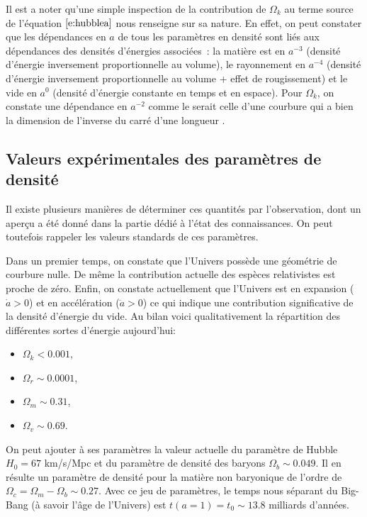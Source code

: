 Il est a noter qu'une simple inspection de la contribution de $\Omega_k$ au terme source de l'équation $\ref{e:hubblea}$ nous renseigne sur sa nature. En effet, on peut constater que les dépendances en $a$ de tous les paramètres en densité sont liés aux dépendances des densités d'énergies associées~: la matière est en $a^{-3}$ (densité d'énergie inversement proportionnelle au volume), le rayonnement en $a^{-4}$ (densité d'énergie inversement proportionnelle au volume + effet de rougissement) et le vide en $a^0$ (densité d'énergie constante en temps et en espace). Pour $\Omega_k$, on constate une dépendance en $a^{-2}$ comme le serait celle d'une courbure qui a bien la dimension de l'inverse du carré d'une longueur .

\subsection{Valeurs expérimentales des paramètres de densité}
Il existe plusieurs manières de déterminer ces quantités par l'observation, dont un aperçu a été donné dans la partie dédié à l'état des connaissances. On peut toutefois rappeler les valeurs standards de ces paramètres. 

Dans un premier temps, on constate que l'Univers possède une géométrie de courbure nulle. De même la contribution actuelle des espèces relativistes est proche de zéro. Enfin, on constate actuellement que l'Univers est en expansion ($\dot a>0$) et en accélération ($\ddot a>0$) ce qui indique une contribution significative de la densité d'énergie du vide. Au bilan voici qualitativement la répartition des différentes sortes d'énergie aujourd'hui:
\begin{itemize}
\item $\Omega_k<0.001$,
\item $\Omega_r\sim0.0001$,
\item $\Omega_m\sim 0.31$,
\item $\Omega_v\sim 0.69$.
\end{itemize}
On peut ajouter à ses paramètres la valeur actuelle du paramètre de Hubble $H_0=67$ km/s/Mpc et du paramètre de densité des baryons $\Omega_b\sim 0.049$.  Il en résulte un paramètre de densité pour la matière non baryonique de l'ordre de $\Omega_c=\Omega_m-\Omega_b\sim0.27$. Avec ce jeu de paramètres, le temps nous séparant du Big-Bang (à savoir l'âge de l'Univers) est $t(a=1)=t_0\sim13.8$ milliards d'années. 

